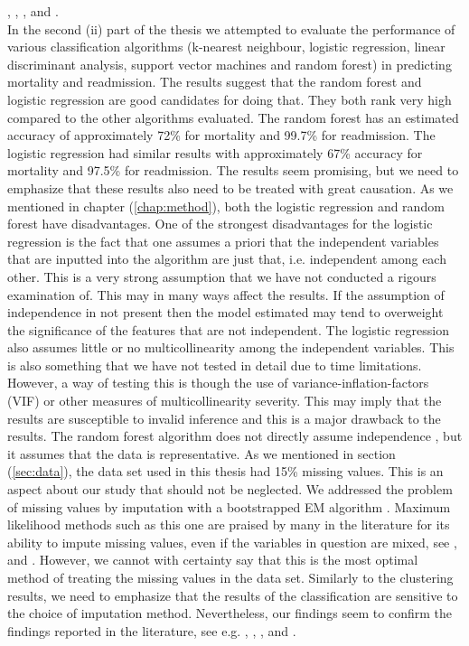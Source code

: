 \documentclass[../thesis.tex]{subfiles}
\begin{document}
\cite{ahmad2014clinical}, \cite{alonso2015exploring}, \cite{kao2015characterization}, \cite{ahmad2016clinical} and \cite{katz2017phenomapping}.\\
\indent In the second (ii) part of the thesis we attempted to evaluate the performance of various classification algorithms (k-nearest neighbour, logistic regression, linear discriminant analysis, support vector machines and random forest) in predicting mortality and readmission. The results suggest that the random forest and logistic regression are good candidates for doing that. They both rank very high compared to the other algorithms evaluated. The random forest has an estimated accuracy of approximately 72\% for mortality and 99.7\% for readmission. The logistic regression had similar results with approximately 67\% accuracy for mortality and 97.5\% for readmission. The results seem promising, but we need to emphasize that these results also need to be treated with great causation. As we mentioned in chapter (\ref{chap:method}), both the logistic regression and random forest have disadvantages. One of the strongest disadvantages for the logistic regression is the fact that one assumes a priori that the independent variables that are inputted into the algorithm are just that, i.e. independent among each other. This is a very strong assumption that we have not conducted a rigours examination of. This may in many ways affect the results. If the assumption of independence in not present then the model estimated may tend to overweight the significance of the features that are not independent. The logistic regression also assumes little or no multicollinearity among the independent variables. This is also something that we have not tested in detail due to time limitations. However, a way of testing this is though the use of variance-inflation-factors (VIF) or other measures of multicollinearity severity. This may imply that the results are susceptible to invalid inference and this is a major drawback to the results. The random forest algorithm does not directly assume independence \citep{friedman2009elements}, but it assumes that the data is representative. As we mentioned in section (\ref{sec:data}), the data set used in this thesis had 15\% missing values. This is an aspect about our study that should not be neglected. We addressed the problem of missing values by imputation with a bootstrapped EM algorithm \citep{honaker2011amelia}. Maximum likelihood methods such as this one are praised by many in the literature for its ability to impute missing values, even if the variables in question are mixed, see \cite{schafer1997analysis}, \cite{schafer1998multiple} and \cite{allison1999missing}. However, we cannot with certainty say that this is the most optimal method of treating the missing values in the data set. Similarly to the clustering results, we need to emphasize that the results of the classification are sensitive to the choice of imputation method. Nevertheless, our findings seem to confirm the findings reported in the literature, see e.g. \cite{austin2012regression}, \cite{zolfaghar2013big}, \cite{shah2014phenomapping}, \cite{panahiazar2015using} and \cite{koulaouzidis2016telemonitoring}.\\
\end{document}
